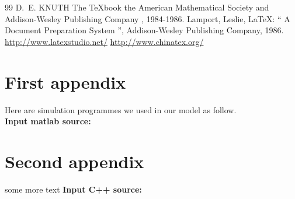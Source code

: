 \documentclass{mcmthesis}
\begin{document}
\begin{thebibliography}{99}
 D.~E. KNUTH   The \TeX{}book  the American
Mathematical Society and Addison-Wesley
Publishing Company , 1984-1986.
Lamport, Leslie,  \LaTeX{}: `` A Document Preparation System '',
Addison-Wesley Publishing Company, 1986.
\url{http://www.latexstudio.net/}
\url{http://www.chinatex.org/}
\end{thebibliography}

\begin{appendices}


\section{First appendix}

\lipsum[13]

Here are simulation programmes we used in our model as follow.\\

\textbf{\textcolor[rgb]{0.98,0.00,0.00}{Input matlab source:}}


\section{Second appendix}

some more text \textcolor[rgb]{0.98,0.00,0.00}{\textbf{Input C++ source:}}


\end{appendices}
\end{document}
